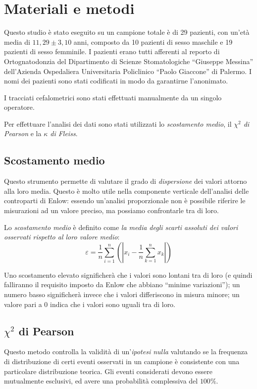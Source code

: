 \chapter{Materiali e metodi}
Questo studio è stato eseguito su un campione totale è di 29 pazienti, con un'età media di $11,29 \pm 3,10$ anni, composto da 10 pazienti di sesso maschile e 19 pazienti di sesso femminile. I pazienti erano tutti afferenti al reporto di Ortognatodonzia del Dipartimento di Scienze Stomatologiche ``Giuseppe Messina'' dell'Azienda Ospedaliera Universitaria Policlinico ``Paolo Giaccone'' di Palermo. I nomi dei pazienti sono stati codificati in modo da garantirne l'anonimato.

I tracciati cefalometrici sono stati effettuati manualmente da un singolo operatore. 

Per effettuare l'analisi dei dati sono stati utilizzati lo \emph{scostamento medio}, il \emph{$\chi^2$ di Pearson} e la \emph{$\kappa$ di Fleiss}.

\section{Scostamento medio}
\label{scostamento_medio}
Questo strumento permette di valutare il grado di \emph{dispersione} dei valori attorno alla loro media. Questo è molto utile nella componente verticale dell'analisi delle controparti di Enlow: essendo un'analisi proporzionale non è possibile riferire le misurazioni ad un valore preciso, ma possiamo confrontarle tra di loro.

Lo \emph{scostamento medio} è definito come \emph{la media degli scarti assoluti dei valori osservati rispetto al loro valore medio}:
\begin{equation}
\label{eq:scostamento_medio}
\varepsilon = \frac{1}{n}\sum_{i=1}^n{\left(\left|x_i - \frac{1}{n}\sum_{k=1}^n x_k\right|\right)}
\end{equation}

Uno scostamento elevato significherà che i valori sono lontani tra di loro (e quindi falliranno il requisito imposto da Enlow che abbiano ``minime variazioni''); un numero basso significherà invece che i valori differiscono in misura minore; un valore pari a 0 indica che i valori sono uguali tra di loro.

\section{$\chi^2$ di Pearson}
Questo metodo controlla la validità di un'\emph{ipotesi nulla} valutando se la frequenza di distribuzione di certi eventi osservati in un campione è consistente con una particolare distribuzione teorica. Gli eventi considerati devono essere mutualmente esclusivi, ed avere una probabilità complessiva del $100\%$.

